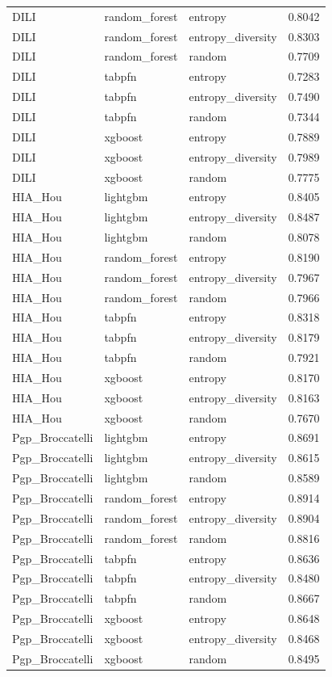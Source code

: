 \begin{tabular}{lllr}
DILI & random_forest & entropy & 0.8042 \\
DILI & random_forest & entropy_diversity & 0.8303 \\
DILI & random_forest & random & 0.7709 \\
DILI & tabpfn & entropy & 0.7283 \\
DILI & tabpfn & entropy_diversity & 0.7490 \\
DILI & tabpfn & random & 0.7344 \\
DILI & xgboost & entropy & 0.7889 \\
DILI & xgboost & entropy_diversity & 0.7989 \\
DILI & xgboost & random & 0.7775 \\
HIA_Hou & lightgbm & entropy & 0.8405 \\
HIA_Hou & lightgbm & entropy_diversity & 0.8487 \\
HIA_Hou & lightgbm & random & 0.8078 \\
HIA_Hou & random_forest & entropy & 0.8190 \\
HIA_Hou & random_forest & entropy_diversity & 0.7967 \\
HIA_Hou & random_forest & random & 0.7966 \\
HIA_Hou & tabpfn & entropy & 0.8318 \\
HIA_Hou & tabpfn & entropy_diversity & 0.8179 \\
HIA_Hou & tabpfn & random & 0.7921 \\
HIA_Hou & xgboost & entropy & 0.8170 \\
HIA_Hou & xgboost & entropy_diversity & 0.8163 \\
HIA_Hou & xgboost & random & 0.7670 \\
Pgp_Broccatelli & lightgbm & entropy & 0.8691 \\
Pgp_Broccatelli & lightgbm & entropy_diversity & 0.8615 \\
Pgp_Broccatelli & lightgbm & random & 0.8589 \\
Pgp_Broccatelli & random_forest & entropy & 0.8914 \\
Pgp_Broccatelli & random_forest & entropy_diversity & 0.8904 \\
Pgp_Broccatelli & random_forest & random & 0.8816 \\
Pgp_Broccatelli & tabpfn & entropy & 0.8636 \\
Pgp_Broccatelli & tabpfn & entropy_diversity & 0.8480 \\
Pgp_Broccatelli & tabpfn & random & 0.8667 \\
Pgp_Broccatelli & xgboost & entropy & 0.8648 \\
Pgp_Broccatelli & xgboost & entropy_diversity & 0.8468 \\
Pgp_Broccatelli & xgboost & random & 0.8495 \\
\bottomrule
\end{tabular}
